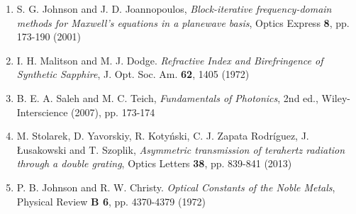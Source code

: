\documentclass[12pt,a4paper]{article}
\begin{document}
\begin{enumerate}
\item S. G. Johnson and J. D. Joannopoulos, \textit{Block-iterative frequency-domain methods for Maxwell's equations in a planewave basis}, Optics Express \textbf{8}, pp. 173-190 (2001)
\item I. H. Malitson and M. J. Dodge. \textit{Refractive Index and Birefringence of Synthetic Sapphire}, J. Opt. Soc. Am. \textbf{62}, 1405 (1972)
\item B. E. A. Saleh and M. C. Teich, \textit{Fundamentals of Photonics}, 2nd ed., Wiley-Interscience (2007), pp. 173-174
\item M. Stolarek, D. Yavorskiy, R. Kotyński, C. J. Zapata Rodríguez, J. Łusakowski and T. Szoplik, \textit{Asymmetric transmission of terahertz radiation through a double grating}, Optics Letters \textbf{38}, pp. 839-841 (2013)
\item P. B. Johnson and R. W. Christy. \textit{Optical Constants of the Noble Metals}, Physical Review \textbf{B 6}, pp. 4370-4379 (1972)
\end{enumerate}
\end{document}
